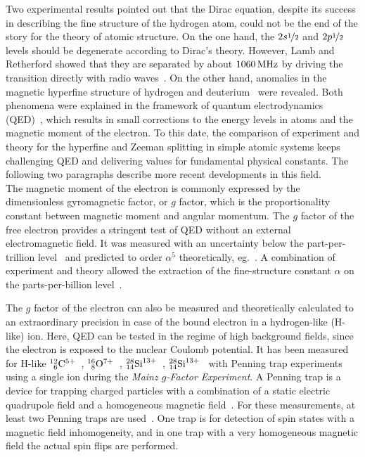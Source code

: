 Two experimental results pointed out that the Dirac equation, despite its success in describing the fine structure of the hydrogen atom, could not be the end of the story for the theory of atomic structure. On the one hand, the $2s\nicefrac{1}{2}$ and $2p\nicefrac{1}{2}$ levels should be degenerate according to Dirac's theory. However, Lamb and Retherford showed that they are separated by about $1060\,\rm{MHz}$ by driving the transition directly with radio waves~\cite{lamb1947}. On the other hand, anomalies in the magnetic hyperfine structure of hydrogen and deuterium~\cite{nafe1947} were revealed. Both phenomena were explained in the framework of quantum electrodynamics (QED)~\cite{schwinger1948}, which results in small corrections to the energy levels in atoms and the magnetic moment of the electron. To this date, the comparison of experiment and theory for the hyperfine and Zeeman splitting in simple atomic systems keeps challenging QED and delivering values for fundamental physical constants. The following two paragraphs describe more recent developments in this field.\\[11pt]
The magnetic moment of the electron is commonly expressed by the dimensionless gyromagnetic factor, or $g$ factor, which is the proportionality constant between magnetic moment and angular momentum. The $g$ factor of the free electron provides a stringent test of QED without an external electromagnetic field. It was measured with an uncertainty below the part-per-trillion level~\cite{odom2006,hanneke2008} and predicted to order $\alpha^5$ theoretically, eg.~\cite{kinoshita2006,aoyama2007,aoyama2015,aoyama2017}. A combination of experiment and theory allowed the extraction of the fine-structure constant $\alpha$ on the parts-per-billion level~\cite{gabrielse2006,gabrielse2007}.

The $g$ factor of the electron can also be measured and theoretically calculated to an extraordinary precision in case of the bound electron in a hydrogen-like (H-like) ion. Here, QED can be tested in the regime of high background fields, since the electron is exposed to the nuclear Coulomb potential. It has been measured for H-like $^{12}_{\phantom{0}6}\rm{C}^{5+}$~\cite{Haffner2000,Sturm2014}, $^{16}_{\phantom{0}8}\rm{O}^{7+}$~\cite{Verdu2004}, $^{28}_{14}\rm{Si}^{13+}$~\cite{Sturm2011},  $^{28}_{14}\rm{Si}^{13+}$~\cite{Sturm2011} with Penning trap experiments using a single ion during the \textit{Mainz $g$-Factor Experiment}. A Penning trap is a device for trapping charged particles with a combination of a static electric quadrupole field and a homogeneous magnetic field~\cite{geoniumtheory}. For these measurements, at least two Penning traps are used~\cite{annphysgfactor}. One trap is for detection of spin states with a magnetic field inhomogeneity, and in one trap with a very homogeneous magnetic field the actual spin flips are performed.

